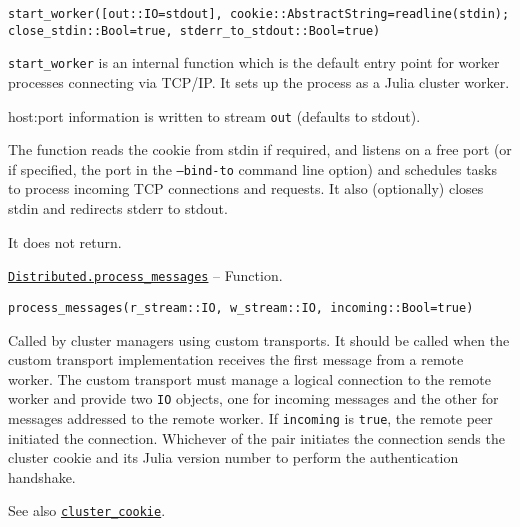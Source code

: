 \begin{adjustwidth}{2em}{0pt}


\begin{verbatim}
start_worker([out::IO=stdout], cookie::AbstractString=readline(stdin); close_stdin::Bool=true, stderr_to_stdout::Bool=true)
\end{verbatim}

\texttt{start\_worker} is an internal function which is the default entry point for worker processes connecting via TCP/IP. It sets up the process as a Julia cluster worker.

host:port information is written to stream \texttt{out} (defaults to stdout).

The function reads the cookie from stdin if required, and  listens on a free port (or if specified, the port in the \texttt{--bind-to} command line option) and schedules tasks to process incoming TCP connections and requests. It also (optionally) closes stdin and redirects stderr to stdout.

It does not return.



\end{adjustwidth}
\hypertarget{3971171154765725829}{} 
\hyperlink{3971171154765725829}{\texttt{Distributed.process\_messages}}  -- {Function.}

\begin{adjustwidth}{2em}{0pt}


\begin{verbatim}
process_messages(r_stream::IO, w_stream::IO, incoming::Bool=true)
\end{verbatim}

Called by cluster managers using custom transports. It should be called when the custom transport implementation receives the first message from a remote worker. The custom transport must manage a logical connection to the remote worker and provide two \texttt{IO} objects, one for incoming messages and the other for messages addressed to the remote worker. If \texttt{incoming} is \texttt{true}, the remote peer initiated the connection. Whichever of the pair initiates the connection sends the cluster cookie and its Julia version number to perform the authentication handshake.

See also \hyperlink{914110747490695974}{\texttt{cluster\_cookie}}.



\end{adjustwidth}

\hypertarget{4477435705340973602}{}



